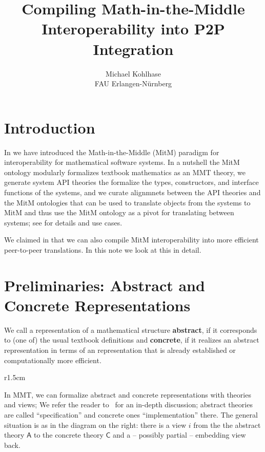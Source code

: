 \documentclass{article}
\title{Compiling Math-in-the-Middle Interoperability into P2P Integration}
\author{Michael Kohlhase\\FAU Erlangen-N\"urnberg}
\def\cn#1{\ensuremath{\mathsf{#1}}}
\def\defemph{\textbf}
\begin{document}
\maketitle

\section{Introduction}

In \cite{DehKohKon:iop16} we have introduced the Math-in-the-Middle (MitM) paradigm for
interoperability for mathematical software systems. In a nutshell the MitM ontology
modularly formalizes textbook mathematics as an MMT theory, we generate system API
theories the formalize the types, constructors, and interface functions of the systems,
and we curate alignmnets between the API theories and the MitM ontologies that can be used
to translate objects from the systems to MitM and thus use the MitM ontology as a pivot
for translating between systems; see \cite{KohMuePfe:kbimss17} for details and use cases.

We claimed in that we can also compile MitM interoperability into more efficient
peer-to-peer translations. In this note we look at this in detail.

\section{Preliminaries: Abstract and Concrete Representations}

We call a representation of a mathematical structure \defemph{abstract}, if it corresponds
to (one of) the usual textbook definitions and \defemph{concrete}, if it realizes an
abstract representation in terms of an representation that is already established or
computationally more efficient. 

\begin{wrapfigure}r{1.5cm}\vspace*{-1em}
\end{wrapfigure}
In MMT, we can formalize abstract and concrete representations with theories and views; We
refer the reader to~\cite{KohRabSac:fvip11} for an in-depth discussion; abstract theories
are called ``specification'' and concrete ones ``implementation'' there.  The general
situation is as in the diagram on the right: there is a view $i$ from the the abstract
theory $\cn{A}$ to the concrete theory $\cn{C}$ and a -- possibly partial -- embedding
view back.
\end{document}
